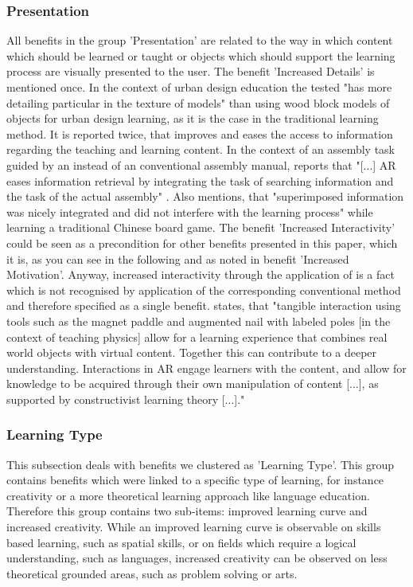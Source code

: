 \subsubsection{Presentation}
All benefits in the group 'Presentation' are related to the way in which content which should be learned or taught or objects which should support the learning process are visually presented to the user.  
The benefit 'Increased Details' is mentioned once. In the context of urban design education the tested \AR "has more detailing particular in the texture of models"\autocite[17]{Chen.2008} than using wood block models of objects for urban 
design learning, as it is the case in the traditional learning method.
It is reported twice, that \AR \apps improves and eases the access to information regarding the teaching and learning content. In the context of an assembly task guided by an \AR \app instead of an conventional 
assembly manual, \cite{Hou.2013} reports that "[...] AR eases information retrieval by integrating the task of searching information and the task of the actual assembly" \autocite[447]{Hou.2013}. Also \cite{Iwata.2011}
mentions, that "superimposed information was nicely integrated and did not interfere with the learning process"\autocite[112]{Iwata.2011} while learning a traditional Chinese board game.
The benefit 'Increased Interactivity' could be seen as a precondition for other benefits presented in this paper, which it is, as you can see in the following and as noted in benefit 'Increased Motivation'. Anyway, increased interactivity through the application of \AR is a 
fact which is not recognised by application of the corresponding conventional method\autocite[cf.][113]{Dunser.2012}\mulcit\autocite[cf.][11]{Ibanez.2014} and therefore specified as a single benefit.
\cite{Dunser.2012} states, that "tangible interaction using tools such as the magnet paddle and augmented nail with labeled poles [in the context of teaching physics] allow for a learning experience that combines real world objects with virtual content. 
Together this can contribute to a deeper understanding. Interactions in AR engage learners with the content, and allow for knowledge to be acquired through their own manipulation of content [...], 
as supported by constructivist learning theory [...]."

% 
\subsubsection{Learning Type}
This subsection deals with benefits we clustered as 'Learning Type'. This group contains benefits which were linked to a specific type of learning, for instance creativity or a more theoretical learning approach like language education. \\
Therefore this group contains two sub-items: improved learning curve and increased creativity. While an improved learning curve is observable on skills based learning, such as spatial skills, or on fields which require a logical understanding, such as languages, increased creativity can be observed on less theoretical grounded areas, such as problem solving or arts.

